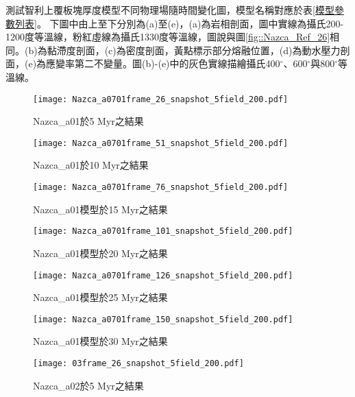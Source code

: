 
測試智利上覆板塊厚度模型不同物理場隨時間變化圖，模型名稱對應於表\ref{模型參數列表}。
下圖中由上至下分別為(a)至(e)，(a)為岩相剖面，圖中實線為攝氏200-1200度等溫線，粉紅虛線為攝氏1330度等溫線，圖說與圖\ref{fig::Nazca_Ref_26}相同。(b)為黏滯度剖面，(c)為密度剖面，黃點標示部分熔融位置，(d)為動水壓力剖面，(e)為應變率第二不變量。圖(b)-(e)中的灰色實線描繪攝氏400$^{\circ}$、600$^{\circ}$與800$^{\circ}$等溫線。
\begin{figure*}[ht!]
    \centering
    \texttt{[image: Nazca\_a0701frame\_26\_snapshot\_5field\_200.pdf]}
    \caption{Nazca\_a01於5 Myr之結果}
    \label{fig::Nazca_01_26}
\end{figure*}

\begin{figure*}[ht!]
    \centering
    \texttt{[image: Nazca\_a0701frame\_51\_snapshot\_5field\_200.pdf]}
    \caption{Nazca\_a01於10 Myr之結果}
\end{figure*}

\begin{figure*}[ht!]
    \centering
    \texttt{[image: Nazca\_a0701frame\_76\_snapshot\_5field\_200.pdf]}
    \caption{Nazca\_a01模型於15 Myr之結果}
\end{figure*}

\begin{figure*}[ht!]
    \centering
    \texttt{[image: Nazca\_a0701frame\_101\_snapshot\_5field\_200.pdf]}
    \caption{Nazca\_a01模型於20 Myr之結果}
\end{figure*}

\begin{figure*}[ht!]
    \centering
    \texttt{[image: Nazca\_a0701frame\_126\_snapshot\_5field\_200.pdf]}
    \caption{Nazca\_a01模型於25 Myr之結果}
\end{figure*}

\begin{figure*}[ht!]
    \centering
    \texttt{[image: Nazca\_a0701frame\_150\_snapshot\_5field\_200.pdf]}
    \caption{Nazca\_a01模型於30 Myr之結果}
    \label{fig::Nazca_01_150}
\end{figure*}


\begin{figure*}[ht!]
    \centering
    \texttt{[image: 03frame\_26\_snapshot\_5field\_200.pdf]}
    \caption{Nazca\_a02於5 Myr之結果}
    \label{fig::Nazca_02_26}
\end{figure*}

